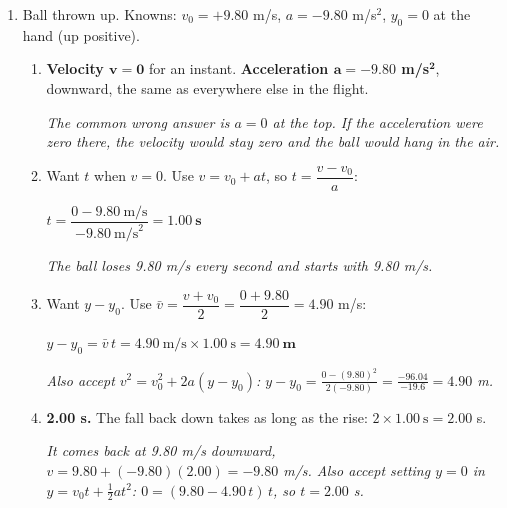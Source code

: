 \documentclass[12pt, twoside]{article}
\begin{document}
\begin{enumerate}[itemsep=0.5cm]
\begin{enumerate}[itemsep=0.3cm]
      $v = 0 + (9.80~\text{m/s}^2)(2.00~\text{s}) = \mathbf{19.6~\textbf{m/s}}$
      downward
    \item Want $y - y_0$. Use $y = y_0 + v_0 t + \frac{1}{2}at^2$ with $v_0 = 0$:

      $y - y_0 = \tfrac{1}{2}(9.80~\text{m/s}^2)(2.00~\text{s})^2
      = 4.90 \times 4.00 = \mathbf{19.6~\textbf{m}}$

      \emph{The two answers share the digits 19.6 only because $t = 2.00$ s; one is a
      speed and one a height. Also accept $\bar{v}\,t = 9.80~\text{m/s} \times
      2.00~\text{s}$. The usual slip is forgetting the $\frac{1}{2}$ (39.2 m) or not
      squaring the time (9.80 m).}
  \end{enumerate}

\item Ball thrown up. Knowns: $v_0 = +9.80$ m/s, $a = -9.80$ m/s$^2$, $y_0 = 0$ at
  the hand (up positive).
  \begin{enumerate}[itemsep=0.3cm]
    \item \textbf{Velocity $\mathbf{v = 0}$} for an instant. \textbf{Acceleration
      $\mathbf{a = -9.80}$ m/s$^\mathbf{2}$}, downward, the same as everywhere else
      in the flight.

      \emph{The common wrong answer is $a = 0$ at the top. If the acceleration were
      zero there, the velocity would stay zero and the ball would hang in the air.}
    \item Want $t$ when $v = 0$. Use $v = v_0 + at$, so $t = \dfrac{v - v_0}{a}$:

      $t = \dfrac{0 - 9.80~\text{m/s}}{-9.80~\text{m/s}^2} = \mathbf{1.00~\textbf{s}}$

      \emph{The ball loses 9.80 m/s every second and starts with 9.80 m/s.}
    \item Want $y - y_0$. Use $\bar{v} = \dfrac{v + v_0}{2} = \dfrac{0 + 9.80}{2}
      = 4.90$ m/s:

      $y - y_0 = \bar{v}\,t = 4.90~\text{m/s} \times 1.00~\text{s}
      = \mathbf{4.90~\textbf{m}}$

      \emph{Also accept $v^2 = v_0^2 + 2a(y - y_0)$:
      $y - y_0 = \frac{0 - (9.80)^2}{2(-9.80)} = \frac{-96.04}{-19.6} = 4.90$ m.}
    \item \textbf{2.00 s.} The fall back down takes as long as the rise:
      $2 \times 1.00~\text{s} = 2.00$ s.

      \emph{It comes back at 9.80 m/s downward, $v = 9.80 + (-9.80)(2.00) = -9.80$
      m/s. Also accept setting $y = 0$ in $y = v_0 t + \frac{1}{2}at^2$:
      $0 = (9.80 - 4.90\,t)\,t$, so $t = 2.00$ s.}
  \end{enumerate}

\end{enumerate}
\end{document}
